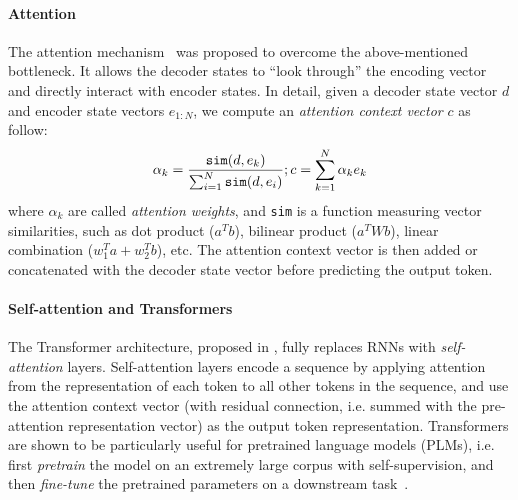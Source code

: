 \documentclass[11pt,dvipdfm]{article}
\begin{document}
\paragraph{Attention} The attention mechanism~\cite{bahdanauAttention,luongAttention} was proposed to overcome the above-mentioned bottleneck. It allows the decoder states to ``look through'' the encoding vector and directly interact with encoder states. In detail, given a decoder state vector $d$ and encoder state vectors $e_{1:N}$, we compute an \textit{attention context vector} $c$ as follow:
$$
    \alpha_k = \frac{\texttt{sim}(d,e_k)}{\sum_{i=1}^{N}\texttt{sim}(d,e_i)} \\
    ;
    c = \sum_{k=1}^{N}\alpha_k e_k
$$
where $\alpha_k$ are called \textit{attention weights}, and \texttt{sim} is a function measuring vector similarities, such as dot product ($a^Tb$), bilinear product ($a^TWb$), linear combination ($w_1^Ta+w_2^Tb$), etc. The attention context vector is then added or concatenated with the decoder state vector before predicting the output token.



\paragraph{Self-attention and Transformers} The Transformer architecture, proposed in \cite{vaswaniTransformer}, fully replaces RNNs with \textit{self-attention} layers. Self-attention layers encode a sequence by applying attention from the representation of each token to all other tokens in the sequence, and use the attention context vector (with residual connection, i.e. summed with the pre-attention representation vector) as the output token representation. 
Transformers are shown to be particularly useful for pretrained language models (PLMs), i.e. first \textit{pretrain} the model on an extremely large corpus with self-supervision, and then \textit{fine-tune} the pretrained parameters on a downstream task~\cite{bert,gpt2}.
\end{document}
